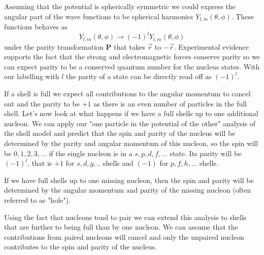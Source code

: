 \documentclass[12pt]{article}
\begin{document}
Assuming that the potential is spherically symmetric we could express the angular part of the wave functions to be spherical harmonics $Y_{l,m}(\theta,\phi)$. These functions behaves as
\[Y_{l,m}(\theta,\phi)\rightarrow (-1)^l Y_{l,m}(\theta,\phi)\]
under the parity transformation $\mathbf{P}$ that takes $\vec{r}$ to $-\vec{r}$. Experimental evidence supports the fact that the strong and electromagnetic forces conserve parity so we can expect parity to be a conserved quantum number for the nucleus states. With our labelling with $l$ the parity of a state can be directly read off as $(-1)^l$.

If a shell is full we expect all contributions to the angular momentum to cancel out and the parity to be $+1$ as there is an even number of particles in the full shell. Let's now look at what happens if we have a full shells up to one additional nucleon. We can apply our "one particle in the potential of the other" analysis of the shell model and predict that the spin and parity of the nucleus will be determined by the parity and angular momentum of this nucleon, so the spin will be $0,1,2,3,...$ if the single nucleon is in a $s,p,d,f,...$ state. Its parity will be $(-1)^l$, that is $+1$ for $s,d,g,..$ shells and $(-1)$ for $p,f,h,...$ shells. 

If we have full shells up to one missing nucleon, then the spin and parity will be determined by the angular momentum and parity of the missing nucleon (often referred to as "hole").

Using the fact that nucleons tend to pair we can extend this analysis to shells that are further to being full than by one nucleon. We can assume that the contributions from paired nucleons will cancel and only the unpaired nucleon contributes to the spin and parity of the nucleus. 
\end{document}
